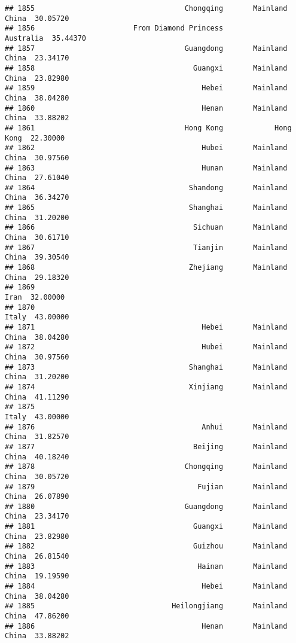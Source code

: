\documentclass[
]{article}
\begin{document}
\begin{verbatim}
## 1855                                   Chongqing       Mainland China  30.05720
## 1856                       From Diamond Princess            Australia  35.44370
## 1857                                   Guangdong       Mainland China  23.34170
## 1858                                     Guangxi       Mainland China  23.82980
## 1859                                       Hebei       Mainland China  38.04280
## 1860                                       Henan       Mainland China  33.88202
## 1861                                   Hong Kong            Hong Kong  22.30000
## 1862                                       Hubei       Mainland China  30.97560
## 1863                                       Hunan       Mainland China  27.61040
## 1864                                    Shandong       Mainland China  36.34270
## 1865                                    Shanghai       Mainland China  31.20200
## 1866                                     Sichuan       Mainland China  30.61710
## 1867                                     Tianjin       Mainland China  39.30540
## 1868                                    Zhejiang       Mainland China  29.18320
## 1869                                                             Iran  32.00000
## 1870                                                            Italy  43.00000
## 1871                                       Hebei       Mainland China  38.04280
## 1872                                       Hubei       Mainland China  30.97560
## 1873                                    Shanghai       Mainland China  31.20200
## 1874                                    Xinjiang       Mainland China  41.11290
## 1875                                                            Italy  43.00000
## 1876                                       Anhui       Mainland China  31.82570
## 1877                                     Beijing       Mainland China  40.18240
## 1878                                   Chongqing       Mainland China  30.05720
## 1879                                      Fujian       Mainland China  26.07890
## 1880                                   Guangdong       Mainland China  23.34170
## 1881                                     Guangxi       Mainland China  23.82980
## 1882                                     Guizhou       Mainland China  26.81540
## 1883                                      Hainan       Mainland China  19.19590
## 1884                                       Hebei       Mainland China  38.04280
## 1885                                Heilongjiang       Mainland China  47.86200
## 1886                                       Henan       Mainland China  33.88202

\end{verbatim}
\end{document}
